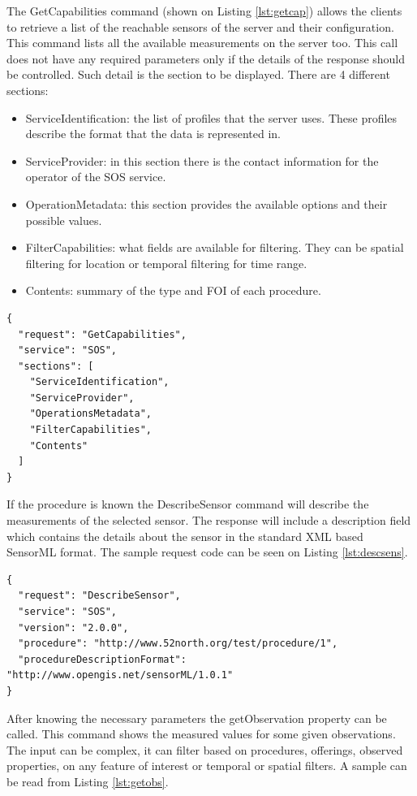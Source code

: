 The GetCapabilities command (shown on Listing \ref{lst:getcap}) allows the clients to retrieve a list of the reachable sensors of the server and their configuration. This command lists all the available measurements on the server too. This call does not have any required parameters only if the details of the response should be controlled. Such detail is the section to be displayed. There are 4 different sections:
\begin{itemize}
\item ServiceIdentification: the list of profiles that the server uses. These profiles describe the format that the data is represented in.
\item ServiceProvider: in this section there is the contact information for the operator of the SOS service.
\item OperationMetadata: this section provides the available options and their possible values.
\item FilterCapabilities: what fields are available for filtering. They can be spatial filtering for location or temporal filtering for time range.
\item Contents: summary of the type and FOI of each procedure. 
\end{itemize}

\begin{lstlisting}[caption={JSON getCapabilities POST request\label{lst:getcap}}]
{
  "request": "GetCapabilities",
  "service": "SOS",
  "sections": [
    "ServiceIdentification",
    "ServiceProvider",
    "OperationsMetadata",
    "FilterCapabilities",
    "Contents"
  ]
}
\end{lstlisting}

 If the procedure is known the DescribeSensor command will describe the measurements of the selected sensor. The response will include a description field which contains the details about the sensor in the standard XML based SensorML format. The sample request code can be seen on Listing \ref{lst:descsens}.

\begin{lstlisting}[caption={JSON DescribeSensor POST request\label{lst:descsens}}]
{
  "request": "DescribeSensor",
  "service": "SOS",
  "version": "2.0.0",
  "procedure": "http://www.52north.org/test/procedure/1",
  "procedureDescriptionFormat": "http://www.opengis.net/sensorML/1.0.1"
}
\end{lstlisting}

After knowing the necessary parameters the getObservation property can be called. This command shows the measured values for some given observations. The input can be complex, it can filter based on procedures, offerings, observed properties, on any feature of interest or temporal or spatial filters. A sample can be read from Listing \ref{lst:getobs}.

